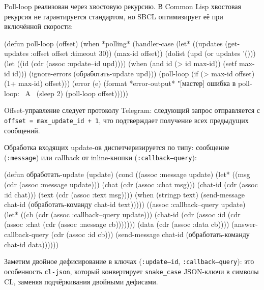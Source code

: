 \documentclass[11pt,a4paper]{article}
\begin{document}
Poll-loop реализован через хвостовую рекурсию. В Common Lisp хвостовая рекурсия не гарантируется стандартом, но SBCL оптимизирует её при включённой скорости:

\begin{lispcode}[caption={мастер/cl/main.lisp — рекурсивный poll-loop}]
(defun poll-loop (offset)
  (when *polling*
    (handler-case
        (let* ((updates (get-updates :offset offset :timeout 30))
               (max-id offset))
          (dolist (upd (or updates '()))
            (let ((id (cdr (assoc :update--id upd))))
              (when (and id (> id max-id))
                (setf max-id id)))
            (ignore-errors (обработать-update upd)))
          (poll-loop
            (if (> max-id offset) (1+ max-id) offset)))
      (error (e)
        (format *error-output*
                "[мастер] ошибка в poll-loop: ~A~%
        (sleep 2)
        (poll-loop offset)))))
\end{lispcode}

Offset-управление следует протоколу Telegram: следующий запрос отправляется с \texttt{offset = max\_update\_id + 1}, что подтверждает получение всех предыдущих сообщений.

Обработка входящих update-ов диспетчеризируется по типу: сообщение (\texttt{:message}) или callback от inline-кнопки (\texttt{:callback--query}):

\begin{lispcode}[caption={мастер/cl/main.lisp — dispatch по типу update}]
(defun обработать-update (update)
  (cond
    ((assoc :message update)
     (let* ((msg     (cdr (assoc :message update)))
            (chat    (cdr (assoc :chat msg)))
            (chat-id (cdr (assoc :id chat)))
            (text    (cdr (assoc :text msg))))
       (when (stringp text)
         (send-message chat-id
           (обработать-команду chat-id text)))))
    ((assoc :callback--query update)
     (let* ((cb      (cdr (assoc :callback--query update)))
            (chat-id (cdr (assoc :id
                            (cdr (assoc :chat
                              (cdr (assoc :message cb)))))))
            (data    (cdr (assoc :data cb))))
       (answer-callback-query (cdr (assoc :id cb)))
       (send-message chat-id
         (обработать-команду chat-id data))))))
\end{lispcode}

Заметим двойное дефисирование в ключах (\texttt{:update--id}, \texttt{:callback--query}): это особенность \texttt{cl-json}, который конвертирует \texttt{snake\_case} JSON-ключи в символы CL, заменяя подчёркивания двойными дефисами.
\end{document}
